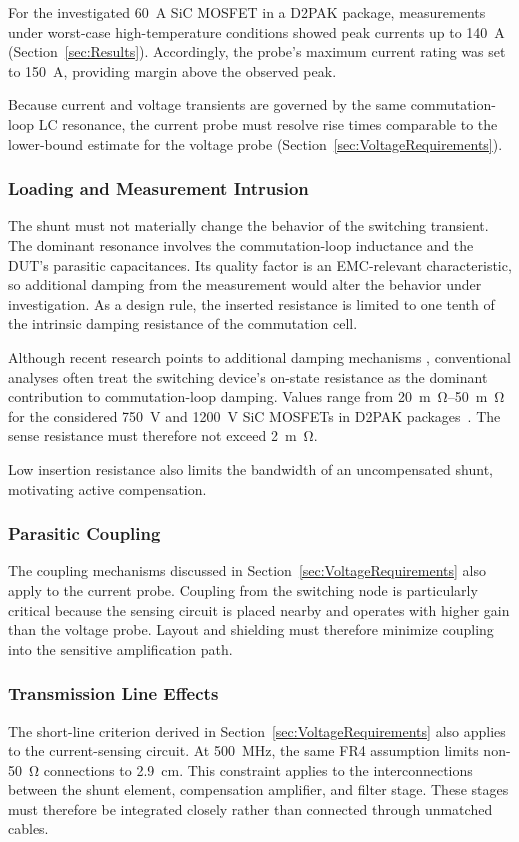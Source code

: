 For the investigated \SI{60}{A} SiC MOSFET in a D2PAK package, measurements under worst-case high-temperature conditions showed peak currents up to \SI{140}{A} (Section~\ref{sec:Results}).
Accordingly, the probe's maximum current rating was set to \SI{150}{A}, providing margin above the observed peak.

Because current and voltage transients are governed by the same commutation-loop LC resonance, the current probe must resolve rise times comparable to the lower-bound estimate for the voltage probe (Section~\ref{sec:VoltageRequirements}).

\subsubsection*{Loading and Measurement Intrusion}
The shunt must not materially change the behavior of the switching transient.
The dominant resonance involves the commutation-loop inductance and the DUT's parasitic capacitances.
Its quality factor is an EMC-relevant characteristic, so additional damping from the measurement would alter the behavior under investigation.
As a design rule, the inserted resistance is limited to one tenth of the intrinsic damping resistance of the commutation cell.

Although recent research points to additional damping mechanisms \cite{GaNRoss}, conventional analyses often treat the switching device's on-state resistance as the dominant contribution to commutation-loop damping.
Values range from \SIrange{20}{50}{m\ohm} for the considered \SI{750}{V} and \SI{1200}{V} SiC MOSFETs in D2PAK packages~\cite{robert_bosch_gmbh_datasheet_2023,robert_bosch_gmbh_datasheet_2023-1}.
The sense resistance must therefore not exceed \SI{2}{m\ohm}.

Low insertion resistance also limits the bandwidth of an uncompensated shunt, motivating active compensation.

\subsubsection*{Parasitic Coupling}
The coupling mechanisms discussed in Section~\ref{sec:VoltageRequirements} also apply to the current probe.
Coupling from the switching node is particularly critical because the sensing circuit is placed nearby and operates with higher gain than the voltage probe.
Layout and shielding must therefore minimize coupling into the sensitive amplification path.

\subsubsection*{Transmission Line Effects}
The short-line criterion derived in Section~\ref{sec:VoltageRequirements} also applies to the current-sensing circuit.
At \SI{500}{MHz}, the same FR4 assumption limits non-\SI{50}{\ohm} connections to \SI{2.9}{cm}.
This constraint applies to the interconnections between the shunt element, compensation amplifier, and filter stage.
These stages must therefore be integrated closely rather than connected through unmatched cables.

